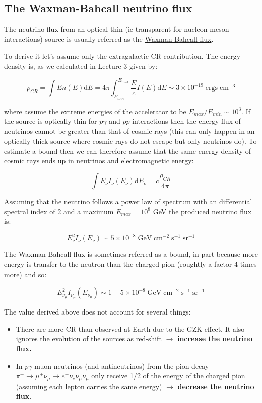 \documentclass[
  letterpaper,
  DIV=11,
  numbers=noendperiod]{scrreprt}
\providecommand{\tightlist}{%
  \setlength{\itemsep}{0pt}\setlength{\parskip}{0pt}}\usepackage{longtable,booktabs,array}
\begin{document}
\subsection{The Waxman-Bahcall neutrino
flux}\label{the-waxman-bahcall-neutrino-flux}

The neutrino flux from an optical thin (ie transparent for nucleon-meson
interactions) source is usually referred as the
\href{http://journals.aps.org/prd/abstract/10.1103/PhysRevD.64.023002}{Waxman-Bahcall
flux}.

To derive it let's assume only the extragalactic CR contribution. The
energy density is, as we calculated in Lecture 3 given by:

\[\rho_{CR} = \int E n(E) \mathrm{ d} E =4\pi \int_{E_{min}}^{E_{max}} \frac{E}{c}I(E) \mathrm{ d} E \sim 3\times 10^{-19} \mathrm{\; ergs\; cm^{-3}}\]

where assume the extreme energies of the accelerator to be
\(E_{max}/E_{min} \sim 10^{3}\). If the source is optically thin for
\(p\gamma\) and \(pp\) interactions then the energy flux of neutrinos
cannot be greater than that of cosmic-rays (this can only happen in an
optically thick source where cosmic-rays do not escape but only
neutrinos do). To estimate a bound then we can therefore assume that the
same energy density of cosmic rays ends up in neutrinos and
electromagnetic energy:

\[\int E_\nu I_\nu (E_\nu) \mathrm{ d}E_\nu = c \frac{\rho_{CR}}{4\pi}\]

Assuming that the neutrino follows a power law of spectrum with an
differential spectral index of 2 and a maximum \(E_{max} = 10^{8}\) GeV
the produced neutrino flux is:

\[E_\nu^2 I_\nu (E_\nu) \sim 5 \times 10^{-8} \mathrm{ \; GeV\; cm^{-2}\; s^{-1}\; sr^{-1}}\]

The Waxman-Bahcall flux is sometimes referred as a bound, in part
because more energy is transfer to the neutron than the charged pion
(roughtly a factor 4 times more) and so:

\[E_{\nu_\mu}^2 I_{\nu_\mu} (E_{\nu_\mu}) \sim 1 - 5 \times 10^{-8} \mathrm{ \; GeV\; cm^{-2}\; s^{-1}\; sr^{-1}}\]

The value derived above does not account for several things:

\begin{itemize}
\tightlist
\item
  There are more CR than observed at Earth due to the GZK-effect. It
  also ignores the evolution of the sources as red-shift \(\rightarrow\)
  \textbf{increase the neutrino flux.}
\item
  In \(p\gamma\) muon neutrinos (and antineutrinos) from the pion decay
  \(\pi^+ \rightarrow \mu^+ \nu_\mu \rightarrow e^+ \nu_e \bar{\nu}_\mu \nu_\mu\)
  only receive 1/2 of the energy of the charged pion (assuming each
  lepton carries the same energy) \(\rightarrow\) \textbf{decrease the
  neutrino flux}.
\end{itemize}
\end{document}
